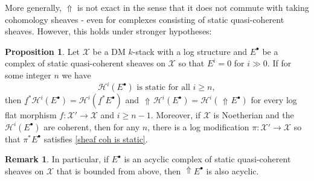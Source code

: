 \documentclass[11pt]{amsart}
\theoremstyle{definition}
\theoremstyle{definition}
\newtheorem{proposition}[theorem]{Proposition}
\newtheorem{remark}[theorem]{Remark}
\DeclareMathOperator{\arrowup}{\!\Uparrow \!}
\newcommand{\ul}[1]{\underline{#1}}
\begin{document}
More generally, $\Uparrow$ is not exact in the sense that it does not commute with taking cohomology sheaves - even for complexes consisting of static quasi-coherent sheaves. However, this holds under stronger hypotheses:
\begin{proposition}\label{prop: static complex prop}
    Let $\mathcal{X}$ be a DM $k$-stack with a log structure and $E^\bullet$ be a complex of static quasi-coherent sheaves on $\mathcal{X}$ so that $E^i=0$ for $i\gg 0$. If for some integer $n$ we have \begin{equation}\label{sheaf coh is static}
        \mathcal{H}^i(E^\bullet) \text{ is static for all } i\geq n,
    \end{equation}
    then $\ul{f}^*\mathcal{H}^i(E^\bullet) = \mathcal{H}^i(\ul{f}^*E^\bullet)$ and $\arrowup \mathcal{H}^i(E^\bullet) = \mathcal{H}^i(\arrowup E^\bullet)$ for every log flat morphism $f\colon\mathcal{X}'\rightarrow\mathcal{X}$ and $i\geq n-1$. Moreover, if $\mathcal{X}$ is Noetherian and the $\mathcal{H}^{i}(E^\bullet)$ are coherent, then for any $n$, there is a log modification $\pi\colon \mathcal{X}'\rightarrow\mathcal{X}$ so that $\pi^*E^\bullet$ satisfies \eqref{sheaf coh is static}.
\end{proposition}
\begin{remark}
    In particular, if $E^\bullet$ is an acyclic complex of static quasi-coherent sheaves on $\mathcal{X}$ that is bounded from above, then $\Uparrow \!\! E^\bullet$ is also acyclic.
\end{remark}
\end{document}
